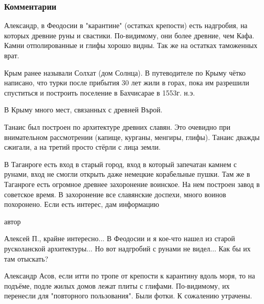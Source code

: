  
 
 
 
 
\subsubsection{Комментарии}

\begin{itemize}

Александр, в Феодосии в "карантине" (остатках крепости) есть надгробия, на
которых древние руны и свастики. По-видимому, они более древние, чем Кафа.
Камни отполированные и глифы хорошо видны. Так же на остатках таможенных врат.

Крым ранее называли Солхат (дом Солнца). В путеводителе по Крыму чётко
написано, что турки после прибытия 30 лет жили в горах, пока им разрешили
спуститься и построить поселение в Бахчисарае в 1553г. н.э.

В Крыму много мест, связанных с древней Върой.

Танаис был построен по архитектуре древних славян. Это очевидно при
внимательном рассмотрении (капище, курганы, менгиры, глифы). Танаис дважды
сжигали, а на третий просто стёрли с лица земли.

В Таганроге есть вход в старый город, вход в который запечатан камнем с рунами,
вход не смогли открыть даже немецкие корабельные пушки. Там же в Таганроге есть
огромное древнее захоронение воинское. На нем построен завод в советское время.
В захоронение все славянские доспехи, много воинов похоронено. Если есть
интерес, дам информацию

автор

Алексей П., крайне интересно... В Феодосии и я кое-что нашел из старой
русколанской архитектуры... Но вот надгробий с рунами не видел... Как бы их там
отыскать?


Александр Асов, если итти по тропе от крепости к карантину вдоль моря, то на
подъёме, подле жилых домов лежат плиты с глифами. По-видимому, их перенесли для
"повторного пользования". Были фотки. К сожалению утрачены.


\end{itemize}
